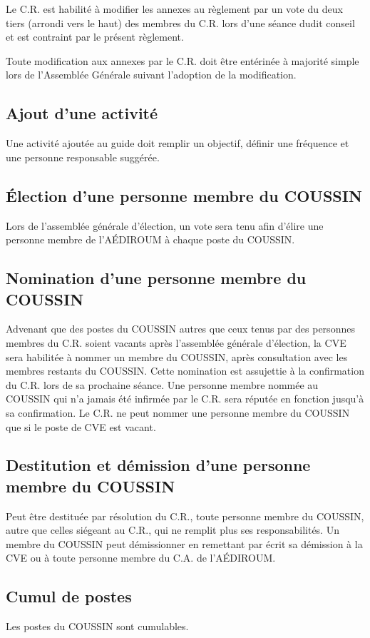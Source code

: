 \documentclass{aediroum}
\begin{document}
Le C.R. est habilité à modifier les annexes au règlement par un vote du deux tiers (arrondi vers le haut) des membres du C.R. lors d'une séance dudit conseil et est contraint par le présent règlement.

Toute modification aux annexes par le C.R. doit être entérinée à majorité simple lors de l'Assemblée Générale suivant l'adoption de la modification.

\subsection{Ajout d'une activité}
Une activité ajoutée au guide doit remplir un objectif, définir une fréquence et une personne responsable suggérée.

\subsection{Élection d'une personne membre du COUSSIN}
Lors de l'assemblée générale d'élection, un vote sera tenu afin d'élire une personne membre de l'AÉDIROUM à chaque poste du COUSSIN.

\subsection{Nomination d'une personne membre du COUSSIN}
Advenant que des postes du COUSSIN autres que ceux tenus par des personnes membres du C.R. soient vacants après l'assemblée générale d'élection, la CVE sera habilitée à nommer un membre du COUSSIN, après consultation avec les membres restants du COUSSIN. Cette nomination est assujettie à la confirmation du C.R. lors de sa prochaine séance. Une personne membre nommée au COUSSIN qui n'a jamais été infirmée par le C.R. sera réputée en fonction jusqu'à sa confirmation. Le C.R. ne peut nommer une personne membre du COUSSIN que si le poste de CVE est vacant.

\subsection{Destitution et démission d'une personne membre du COUSSIN}
Peut être destituée par résolution du C.R., toute personne membre du COUSSIN, autre que celles siégeant au C.R., qui ne remplit plus ses responsabilités. Un membre du COUSSIN peut démissionner en remettant par écrit sa démission à la CVE ou à toute personne membre du C.A. de l'AÉDIROUM.

\subsection{Cumul de postes}
Les postes du COUSSIN sont cumulables.
\end{document}
